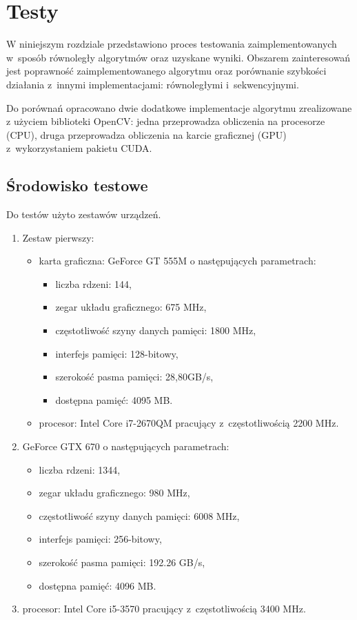 \chapter{Testy}
\label{cha:testy}

W niniejszym rozdziale przedstawiono proces testowania zaimplementowanych w~sposób równoległy algorytmów oraz uzyskane wyniki. Obszarem zainteresowań jest poprawność zaimplementowanego algorytmu oraz porównanie szybkości działania z~innymi implementacjami: równoległymi i~sekwencyjnymi.

Do porównań opracowano dwie dodatkowe implementacje algorytmu zrealizowane z użyciem biblioteki OpenCV: jedna przeprowadza obliczenia na procesorze (CPU), druga przeprowadza obliczenia na karcie graficznej (GPU) z~wykorzystaniem pakietu CUDA.

\section{Środowisko testowe}
\label{sec:srodowiskoTesty}

Do testów użyto zestawów urządzeń.

\begin{enumerate}
\item Zestaw pierwszy:
\begin{itemize}
\item karta graficzna: GeForce GT 555M \cite{GT555M} o następujących parametrach:
\begin{itemize}
\item liczba rdzeni: 144,
\item zegar układu graficznego: 675 MHz,
\item częstotliwość szyny danych pamięci: 1800 MHz,
\item interfejs pamięci: 128-bitowy,
\item szerokość pasma pamięci: 28,80GB/s,
\item dostępna pamięć: 4095 MB.
\end{itemize}
\item procesor: Intel Core i7-2670QM pracujący z~częstotliwością 2200 MHz.
\end{itemize}

\item GeForce GTX 670 \cite{GTX670} o następujących parametrach:
\begin{itemize}
\item liczba rdzeni: 1344,
\item zegar układu graficznego: 980 MHz,
\item częstotliwość szyny danych pamięci: 6008 MHz,
\item interfejs pamięci: 256-bitowy,
\item szerokość pasma pamięci: 192.26 GB/s,
\item dostępna pamięć: 4096 MB.
\end{itemize}
\item procesor: Intel Core i5-3570 pracujący z~częstotliwością 3400 MHz.
\end{enumerate}

